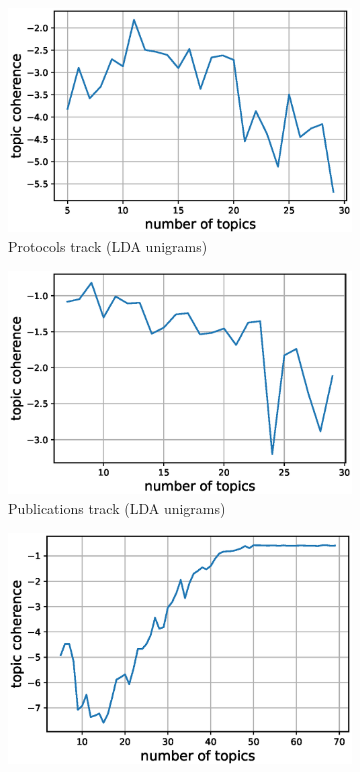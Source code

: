 \documentclass[runningheads]{llncs}
\begin{document}
\begin{figure}
	\centering
	\begin{subfigure}[b]{0.45\textwidth}
		\centering
		\includegraphics[width=\textwidth]{img/protocols_coherence.eps}
		\caption{Protocols track (LDA unigrams)}
	\end{subfigure}
	\hfill
	\begin{subfigure}[b]{0.45\textwidth}
		\centering
		\includegraphics[width=\textwidth]{img/publications_coherence.eps}
		\caption{Publications track (LDA unigrams)}
	\end{subfigure}
	\hfill
	\begin{subfigure}[b]{0.45\textwidth}
		\centering
		\includegraphics[width=\textwidth]{img/git_coherence.eps}

\end{subfigure}
\end{figure}
\end{document}
